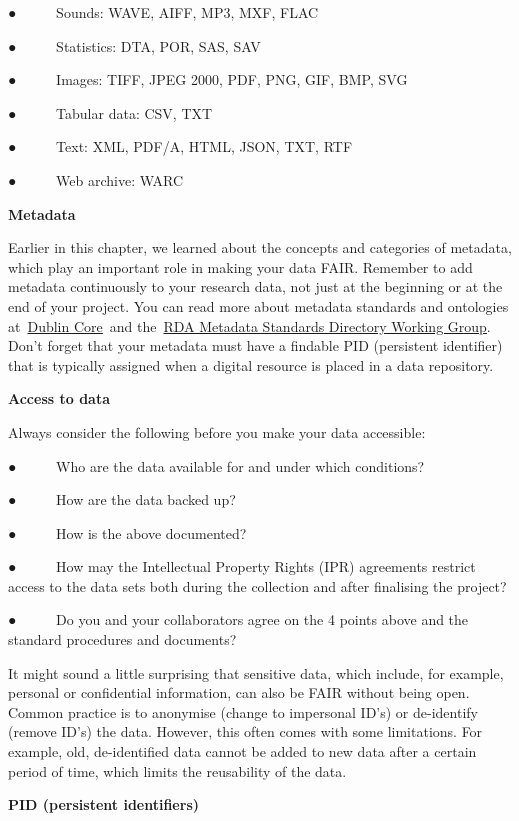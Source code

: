 \documentclass[
]{book}
\begin{document}
● ~ ~ ~ Sounds: WAVE, AIFF, MP3, MXF, FLAC

● ~ ~ ~ Statistics: DTA, POR, SAS, SAV

● ~ ~ ~ Images: TIFF, JPEG 2000, PDF, PNG, GIF, BMP, SVG

● ~ ~ ~ Tabular data: CSV, TXT

● ~ ~ ~ Text: XML, PDF/A, HTML, JSON, TXT, RTF

● ~ ~ ~ Web archive: WARC

\textbf{Metadata}

Earlier in this chapter, we learned about the concepts and categories of metadata, which play an important role in making your data FAIR. Remember to add metadata continuously to your research data, not just at the beginning or at the end of your project. You can read more about metadata standards and ontologies at~\href{https://www.dublincore.org/}{}\href{https://www.dublincore.org/}{Dublin Core}~and the~\href{http://rd-alliance.github.io/metadata-directory/}{}\href{http://rd-alliance.github.io/metadata-directory/}{RDA Metadata Standards Directory Working Group}. Don't forget that your metadata must have a findable PID (persistent identifier) that is typically assigned when a digital resource is placed in a data repository.

\textbf{Access to data}

Always consider the following before you make your data accessible:

● ~ ~ ~ Who are the data available for and under which conditions?

● ~ ~ ~ How are the data backed up?

● ~ ~ ~ How is the above documented?

● ~ ~ ~ How may the Intellectual Property Rights (IPR) agreements restrict access to the data sets both during the collection and after finalising the project?

● ~ ~ ~ Do you and your collaborators agree on the 4 points above and the standard procedures and documents?

It might sound a little surprising that sensitive data, which include, for example, personal or confidential information, can also be FAIR without being open. Common practice is to anonymise (change to impersonal ID's) or de-identify (remove ID's) the data. However, this often comes with some limitations. For example, old, de-identified data cannot be added to new data after a certain period of time, which limits the reusability of the data.

\textbf{PID (persistent identifiers)}
\end{document}
